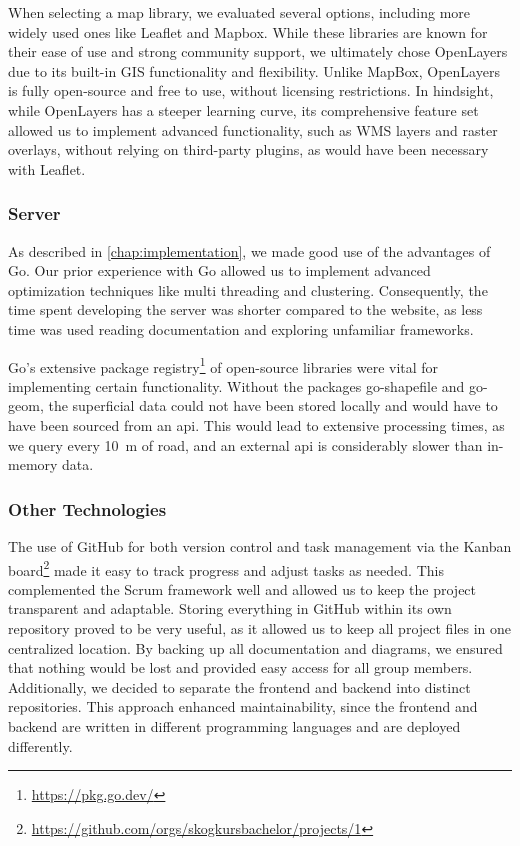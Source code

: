 When selecting a map library, we evaluated several options, including more widely used ones like Leaflet and Mapbox. While these libraries are known for their ease of use and strong community support, we ultimately chose OpenLayers due to its built-in GIS functionality and flexibility. Unlike MapBox, OpenLayers is fully open-source and free to use, without licensing restrictions. In hindsight, while OpenLayers has a steeper learning curve, its comprehensive feature set allowed us to implement advanced functionality, such as WMS layers and raster overlays, without relying on third-party plugins, as would have been necessary with Leaflet.

\subsubsection{Server}

As described in \autoref{chap:implementation}, we made good use of the advantages of Go. Our prior experience with Go allowed us to implement advanced optimization techniques like multi threading and clustering. Consequently, the time spent developing the server was shorter compared to the website, as less time was used reading documentation and exploring unfamiliar frameworks.

Go's extensive package registry\footnote{\url{https://pkg.go.dev/}} of open-source libraries were vital for implementing certain functionality. Without the packages go-shapefile and go-geom, the superficial data could not have been stored locally and would have to have been sourced from an \acrshort{api}. This would lead to extensive processing times, as we query every \qty{10}{\meter} of road, and an external \acrshort{api} is considerably slower than in-memory data.

\subsubsection{Other Technologies}

The use of GitHub for both version control and task management via the Kanban board\footnote{\url{https://github.com/orgs/skogkursbachelor/projects/1}} made it easy to track progress and adjust tasks as needed. This complemented the Scrum framework well and allowed us to keep the project transparent and adaptable. Storing everything in GitHub within its own repository proved to be very useful, as it allowed us to keep all project files in one centralized location. By backing up all documentation and diagrams, we ensured that nothing would be lost and provided easy access for all group members. Additionally, we decided to separate the frontend and backend into distinct repositories. This approach enhanced maintainability, since the frontend and backend are written in different programming languages and are deployed differently.

